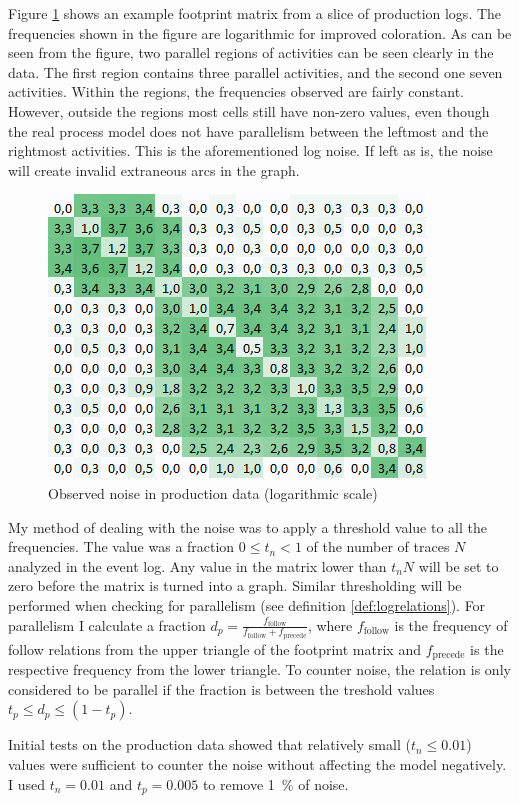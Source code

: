 Figure \ref{fig:examplenoise} shows an example footprint matrix from a slice of production logs.
The frequencies shown in the figure are logarithmic for improved coloration.
As can be seen from the figure, two parallel regions of activities can be seen clearly in the data.
The first region contains three parallel activities, and the second one seven activities.
Within the regions, the frequencies observed are fairly constant.
However, outside the regions most cells still have non-zero values, even though the real process model
does not have parallelism between the leftmost and the rightmost activities.
This is the aforementioned log noise.
If left as is, the noise will create invalid extraneous arcs in the graph.

\begin{figure}[htb]
    \centering \includegraphics[width=0.6\linewidth]{gfx/noise.png}
    \caption{Observed noise in production data (logarithmic scale)}
    \label{fig:examplenoise}
\end{figure}

My method of dealing with the noise was to apply a threshold value to all the frequencies.
The value was a fraction $0 \le t_n < 1$ of the number of traces $N$ analyzed in the event log.
Any value in the matrix lower than $t_n N$ will be set to zero before the matrix is turned into a graph.
Similar thresholding will be performed when checking for parallelism (see definition \ref{def:logrelations}). 
For parallelism I calculate a fraction $d_p = \frac{f_\text{follow}}{f_\text{follow} + f_\text{precede}}$, where $f_\text{follow}$ is the frequency of follow relations from the upper triangle of the footprint matrix and $f_\text{precede}$ is the respective frequency from the lower triangle.
To counter noise, the relation is only considered to be parallel if the fraction is between the treshold values $t_p \le d_p \le (1 - t_p)$. 

Initial tests on the production data showed that relatively small ($t_n \le 0.01$) values were sufficient to counter the noise without affecting the model negatively. 
I used $t_n = 0.01$ and $t_p = 0.005$ to remove 1~\% of noise.

